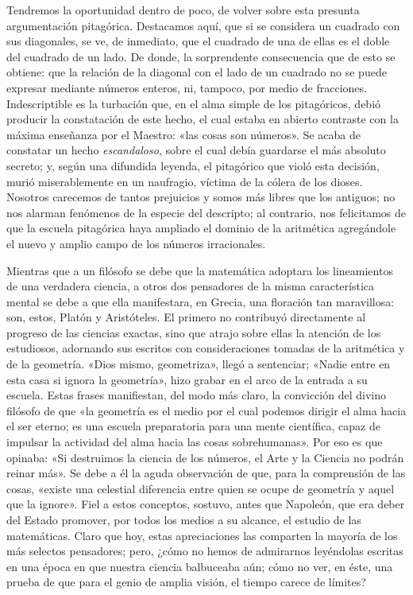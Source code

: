\documentclass[a4paper, 12pt, draft]{article}
\begin{document}
{Tendremos la oportunidad dentro de poco, de volver sobre esta presunta argumentación pitagórica. Destacamos aquí, que si se considera un cuadrado con sus diagonales, se ve, de inmediato, que el cuadrado de una de ellas es el doble del cuadrado de un lado. De donde, la sorprendente consecuencia que de esto se obtiene: que la relación de la diagonal con el lado de un cuadrado no se puede expresar mediante números enteros, ni, tampoco, por medio de fracciones. Indescriptible es la turbación que, en el alma simple de los pitagóricos, debió producir la constatación de este hecho, el cual estaba en abierto
contraste con la máxima enseñanza por el Maestro:
«las cosas son números». Se acaba de constatar un
hecho \textit{ escandaloso}, sobre el cual debía guardarse el más absoluto secreto; y, según una difundida leyenda, el pitagórico que violó esta decisión, murió miserablemente en un naufragio, víctima de la cólera de los dioses. Nosotros carecemos de tantos prejuicios y somos más libres que los antiguos; no nos alarman fenómenos de la especie del descripto; al contrario, nos felicitamos de que la escuela pitagórica haya ampliado el dominio de la aritmética agregándole el nuevo y amplio campo de los números irracionales.



Mientras que a un filósofo se debe que la matemática adoptara los lineamientos de una verdadera ciencia, a otros dos pensadores de la misma característica mental se debe a que ella manifestara, en Grecia, una floración tan maravillosa: son, estos, Platón y Aristóteles. El primero no contribuyó directamente al progreso de las ciencias exactas, sino que atrajo sobre ellas la atención de los estudiosos, adornando sus escritos con consideraciones tomadas de la aritmética y de la geometría. «Dios mismo, geometriza», llegó a sentenciar; «Nadie entre en esta casa si ignora la geometría», hizo grabar en el arco de la entrada a su escuela. Estas frases manifiestan, del modo más claro, la convicción del divino filósofo de que «la geometría es el medio por el cual
podemos dirigir el alma hacia el ser eterno; es una escuela preparatoria para una mente científica, capaz de impulsar la actividad del alma hacia las cosas sobrehumanas». Por eso es que opinaba: «Si destruimos la ciencia de los números, el Arte y la Ciencia no podrán reinar más». Se debe a él la aguda observación de que, para la comprensión de las cosas, «existe una celestial diferencia entre quien se ocupe de geometría y aquel que la ignore». Fiel a estos conceptos, sostuvo, antes que Napoleón, que era deber del Estado promover, por todos los medios a su alcance, el estudio de las matemáticas. Claro que hoy, estas apreciaciones las comparten la mayoría de los más selectos pensadores; pero, ¿cómo no hemos de admirarnos leyéndolas escritas en una época en que nuestra ciencia balbuceaba aún; cómo no ver, en éste, una prueba de que para el genio de amplia visión, el tiempo carece de límites?


}
\end{document}
